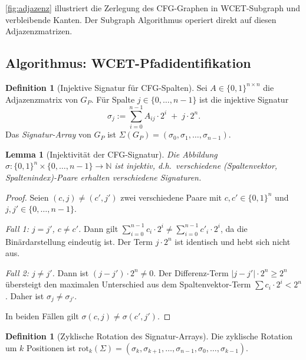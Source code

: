 ﻿\documentclass[a4paper,12pt]{article}
\theoremstyle{plain}
\newtheorem{lemma}[theorem]{Lemma}
\theoremstyle{definition}
\newtheorem{definition}[theorem]{Definition}
\theoremstyle{remark}
\begin{document}
\cref{fig:adjazenz} illustriert die Zerlegung des CFG-Graphen in
WCET-Subgraph und verbleibende Kanten. Der Subgraph Algorithmus
operiert direkt auf diesen Adjazenzmatrizen.

\subsection{Algorithmus: WCET-Pfadidentifikation}\label{ssec:wcet_algo}

\begin{definition}[Injektive Signatur für CFG-Spalten]\label{def:cfg_sig}
Sei $A \in \{0,1\}^{n \times n}$ die Adjazenzmatrix von $G_P$.
Für Spalte $j \in \{0,\ldots,n-1\}$ ist die injektive Signatur
\[
  \sigma_j := \sum_{i=0}^{n-1} A_{ij} \cdot 2^i \;+\; j \cdot 2^n.
\]
Das \emph{Signatur-Array} von $G_P$ ist
$\Sigma(G_P) = (\sigma_0, \sigma_1, \ldots, \sigma_{n-1})$.
\end{definition}

\begin{lemma}[Injektivität der CFG-Signatur]\label{lem:cfg_injektiv}
Die Abbildung $\sigma: \{0,1\}^n \times \{0,\ldots,n-1\} \to \mathbb{N}$
ist injektiv, d.h.\ verschiedene (Spaltenvektor, Spaltenindex)-Paare
erhalten verschiedene Signaturen.
\end{lemma}
\begin{proof}
Seien $(c, j) \neq (c', j')$ zwei verschiedene Paare mit
$c, c' \in \{0,1\}^n$ und $j,j' \in \{0,\ldots,n-1\}$.

\emph{Fall 1: $j = j'$, $c \neq c'$.}
Dann gilt $\sum_{i=0}^{n-1} c_i \cdot 2^i \neq \sum_{i=0}^{n-1} c'_i \cdot 2^i$,
da die Binärdarstellung eindeutig ist. Der Term $j \cdot 2^n$ ist identisch
und hebt sich nicht aus.

\emph{Fall 2: $j \neq j'$.}
Dann ist $(j-j') \cdot 2^n \neq 0$. Der Differenz-Term $|j-j'| \cdot 2^n \geq 2^n$
übersteigt den maximalen Unterschied aus dem Spaltenvektor-Term
$\sum c_i \cdot 2^i < 2^n$. Daher ist $\sigma_j \neq \sigma_{j'}$.

In beiden Fällen gilt $\sigma(c,j) \neq \sigma(c',j')$.
\end{proof}

\begin{definition}[Zyklische Rotation des Signatur-Arrays]\label{def:rotation}
Die zyklische Rotation um $k$ Positionen ist
$\mathrm{rot}_k(\Sigma) = (\sigma_k, \sigma_{k+1}, \ldots, \sigma_{n-1}, \sigma_0, \ldots, \sigma_{k-1})$.
\end{definition}
\end{document}
